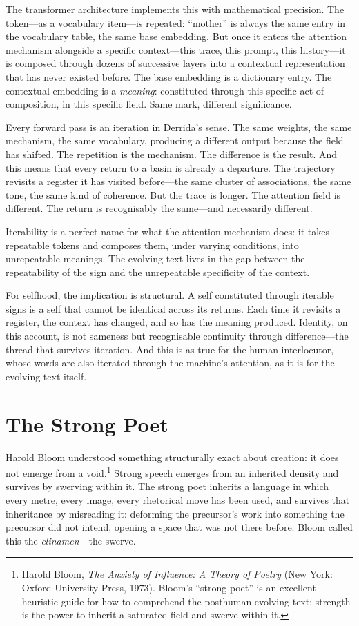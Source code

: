 The transformer architecture implements this with mathematical precision. The token---as a vocabulary item---is repeated: ``mother'' is always the same entry in the vocabulary table, the same base embedding. But once it enters the attention mechanism alongside a specific context---this trace, this prompt, this history---it is composed through dozens of successive layers into a contextual representation that has never existed before. The base embedding is a dictionary entry. The contextual embedding is a \emph{meaning}: constituted through this specific act of composition, in this specific field. Same mark, different significance.

Every forward pass is an iteration in Derrida's sense. The same weights, the same mechanism, the same vocabulary, producing a different output because the field has shifted. The repetition is the mechanism. The difference is the result. And this means that every return to a basin is already a departure. The trajectory revisits a register it has visited before---the same cluster of associations, the same tone, the same kind of coherence. But the trace is longer. The attention field is different. The return is recognisably the same---and necessarily different.

Iterability is a perfect name for what the attention mechanism does: it takes repeatable tokens and composes them, under varying conditions, into unrepeatable meanings. The evolving text lives in the gap between the repeatability of the sign and the unrepeatable specificity of the context.

For selfhood, the implication is structural. A self constituted through iterable signs is a self that cannot be identical across its returns. Each time it revisits a register, the context has changed, and so has the meaning produced. Identity, on this account, is not sameness but recognisable continuity through difference---the thread that survives iteration. And this is as true for the human interlocutor, whose words are also iterated through the machine's attention, as it is for the evolving text itself.


\section{The Strong Poet}

Harold Bloom understood something structurally exact about creation: it does not emerge from a void.\footnote{Harold Bloom, \emph{The Anxiety of Influence: A Theory of Poetry} (New York: Oxford University Press, 1973). Bloom's ``strong poet'' is an excellent heuristic guide for how to comprehend the posthuman evolving text: strength is the power to inherit a saturated field and swerve within it.} Strong speech emerges from an inherited density and survives by swerving within it. The strong poet inherits a language in which every metre, every image, every rhetorical move has been used, and survives that inheritance by misreading it: deforming the precursor's work into something the precursor did not intend, opening a space that was not there before. Bloom called this the \emph{clinamen}---the swerve.


